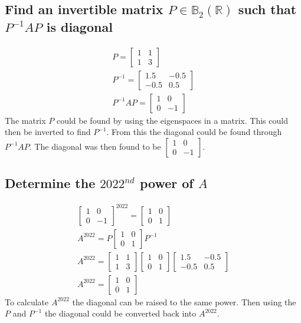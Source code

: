 \documentclass[12pt, a4paper]{article}
\begin{document}
		\subsection{Find an invertible matrix $P\in \mathbb{B}_2(\mathbb{R})$ such that $P^{-1}AP$ is diagonal}
			\begin{align*}
				P=\begin{bmatrix}1&1\\1&3\end{bmatrix}\\
				P^{-1}=\begin{bmatrix}1.5&-0.5\\-0.5&0.5\end{bmatrix}\\
				P^{-1}AP=\begin{bmatrix}1&0\\0&-1\end{bmatrix}
			\end{align*}
			The matrix $P$ could be found by using the eigenspaces in a matrix. This could then be inverted to find $P^{-1}$. From this the diagonal could be found through $P^{-1}AP$. The diagonal was then found to be $\begin{bmatrix}1&0\\0&-1\end{bmatrix}$.
		\subsection{Determine the $2022^{nd}$ power of $A$}
			\begin{align*}
				\begin{bmatrix}1&0\\0&-1\end{bmatrix}^{2022}=\begin{bmatrix}1&0\\0&1\end{bmatrix}\\
				A^{2022}=P\begin{bmatrix}1&0\\0&1\end{bmatrix}P^{-1}\\
				A^{2022}=\begin{bmatrix}1&1\\1&3\end{bmatrix}\begin{bmatrix}1&0\\0&1\end{bmatrix}\begin{bmatrix}1.5&-0.5\\-0.5&0.5\end{bmatrix}\\
				A^{2022}=\begin{bmatrix}1&0\\0&1\end{bmatrix}
			\end{align*}
			To calculate $A^{2022}$ the diagonal can be raised to the same power. Then using the $P$ and $P^{-1}$ the diagonal could be converted back into $A^{2022}$.
	\clearpage
\end{document}
